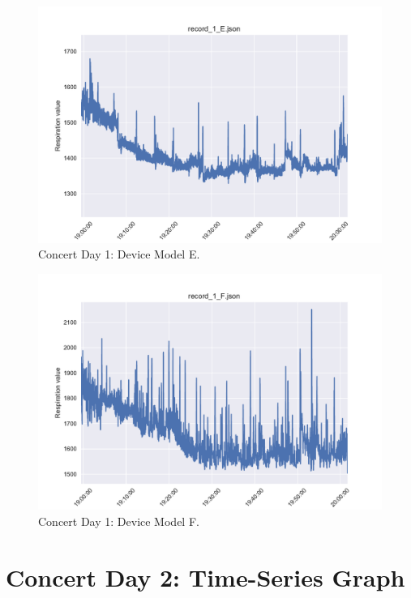 \begin{figure}
    \centering
    \includegraphics[scale=0.6]{images/record_1_e.pdf}
    \caption{Concert Day 1: Device Model E.}
    \label{fig:concert_day1_e}
\end{figure}

\begin{figure}
    \centering
    \includegraphics[scale=0.6]{images/record_1_f.pdf}
    \caption{Concert Day 1: Device Model F.}
    \label{fig:concert_day1_f}
\end{figure}

\section{Concert Day 2: Time-Series Graph}


